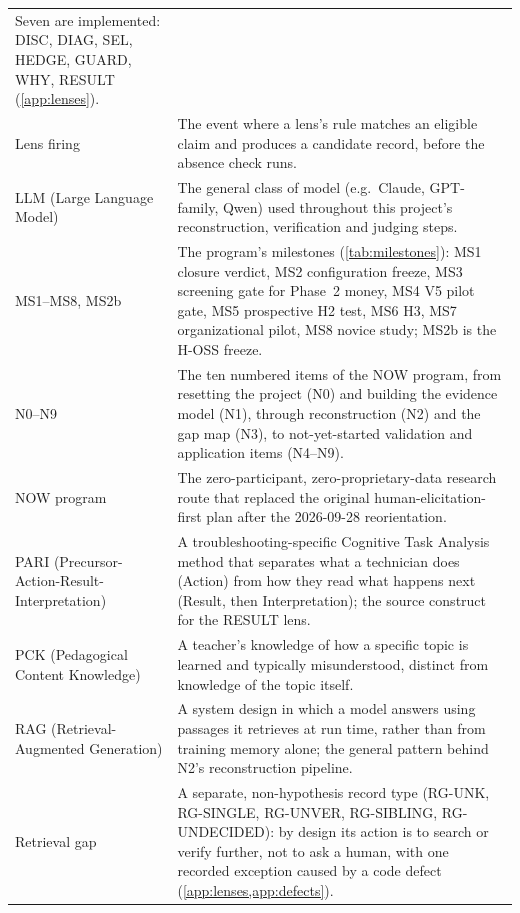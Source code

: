 \begin{longtable}{
    >{\raggedright\arraybackslash}p{3.2cm}
    >{\raggedright\arraybackslash}p{10.3cm}
  }
    Seven are implemented: DISC, DIAG, SEL, HEDGE, GUARD, WHY, RESULT (\cref{app:lenses}). \\
  \addlinespace[2pt]
  Lens firing & The event where a lens's rule matches an eligible claim and produces a candidate
    record, before the absence check runs. \\
  \addlinespace[2pt]
  LLM (Large Language Model) & The general class of model (e.g.\ Claude, GPT-family, Qwen) used
    throughout this project's reconstruction, verification and judging steps. \\
  \addlinespace[2pt]
  MS1--MS8, MS2b & The program's milestones (\cref{tab:milestones}): MS1 closure verdict, MS2
    configuration freeze, MS3 screening gate for Phase~2 money, MS4 V5 pilot gate, MS5 prospective H2 test,
    MS6 H3, MS7 organizational pilot, MS8 novice study; MS2b is the H-OSS freeze. \\
  \addlinespace[2pt]
  N0--N9 & The ten numbered items of the NOW program, from resetting the project (N0) and
    building the evidence model (N1), through reconstruction (N2) and the gap map (N3), to
    not-yet-started validation and application items (N4--N9). \\
  \addlinespace[2pt]
  NOW program & The zero-participant, zero-proprietary-data research route that replaced the
    original human-elicitation-first plan after the 2026-09-28 reorientation. \\
  \addlinespace[2pt]
  PARI (Precursor-Action-Result-Interpretation) & A troubleshooting-specific Cognitive Task
    Analysis method that separates what a technician does (Action) from how they read what
    happens next (Result, then Interpretation); the source construct for the RESULT lens. \\
  \addlinespace[2pt]
  PCK (Pedagogical Content Knowledge) & A teacher's knowledge of how a specific topic is learned
    and typically misunderstood, distinct from knowledge of the topic itself. \\
  \addlinespace[2pt]
  RAG (Retrieval-Augmented Generation) & A system design in which a model answers using passages
    it retrieves at run time, rather than from training memory alone; the general pattern behind
    N2's reconstruction pipeline. \\
  \addlinespace[2pt]
  Retrieval gap & A separate, non-hypothesis record type (RG-UNK, RG-SINGLE, RG-UNVER,
    RG-SIBLING, RG-UNDECIDED): by design its action is to search or verify further, not to ask a
    human, with one recorded exception caused by a code defect (\cref{app:lenses,app:defects}). \\

\end{longtable}
